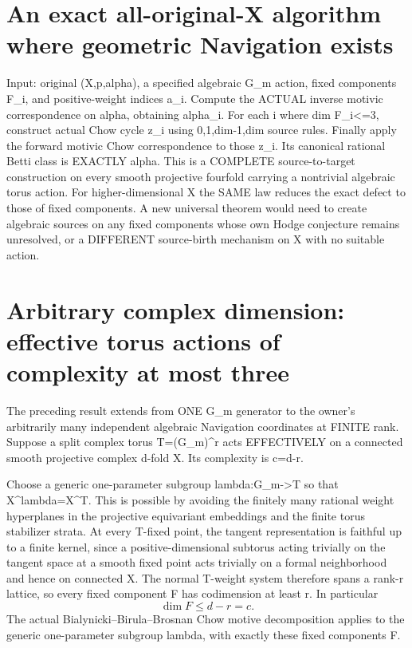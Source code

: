 \documentclass[11pt]{article}
\begin{document}
\section{An exact all-original-X algorithm where geometric Navigation exists}
Input: original (X,p,alpha), a specified algebraic
G_m action, fixed components F_i, and positive-weight
indices a_i. Compute the ACTUAL inverse motivic
correspondence on alpha, obtaining alpha_i.
For each i where dim F_i<=3, construct actual Chow
cycle z_i using 0,1,dim-1,dim source rules.
Finally apply the forward motivic Chow correspondence
to those z_i. Its canonical rational Betti class is
EXACTLY alpha.
This is a COMPLETE source-to-target construction
on every smooth projective fourfold carrying
a nontrivial algebraic torus action.
For higher-dimensional X the SAME law reduces
the exact defect to those of fixed components.
A new universal theorem would need to create
algebraic sources on any fixed components whose
own Hodge conjecture remains unresolved,
or a DIFFERENT source-birth mechanism on X
with no suitable action.

\section{Arbitrary complex dimension: effective torus actions of complexity at most three}
The preceding result extends from ONE G_m generator
to the owner's arbitrarily many independent
algebraic Navigation coordinates at FINITE rank.
Suppose a split complex torus
T=(G_m)^r acts EFFECTIVELY on a connected
smooth projective complex d-fold X.
Its complexity is c=d-r.

Choose a generic one-parameter subgroup
lambda:G_m->T so that X^{lambda}=X^T.
This is possible by avoiding the finitely
many rational weight hyperplanes in the
projective equivariant embeddings and
the finite torus stabilizer strata.
At every T-fixed point, the tangent
representation is faithful up to a
finite kernel, since a positive-dimensional
subtorus acting trivially on the tangent
space at a smooth fixed point acts trivially
on a formal neighborhood and hence on
connected X. The normal T-weight system
therefore spans a rank-r lattice, so
every fixed component F has codimension
at least r. In particular
\[
\boxed{\dim F\le d-r=c.}
\]
The actual Bialynicki--Birula--Brosnan
Chow motive decomposition applies to
the generic one-parameter subgroup
lambda, with exactly these fixed
components F.
\end{document}
